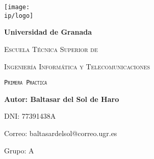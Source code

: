 \documentclass[..]{subfiles}
\title{}
\begin{document}
\begin{titlepage}
	\centering
	{\texttt{[image: \\ip/logo]}\par}
	\vspace{0cm}
	{\bfseries\LARGE Universidad de Granada \par}

	\vspace{1cm}
	{\scshape\Large Escuela Técnica Superior de \par}
	{\scshape\Large Ingeniería Informática y Telecomunicaciones \par}

	\vspace{5cm}
	{\scshape\Large \texttt{Primera Practica} \par}

	\vspace{7.5cm}
	{ \textbf{Autor: Baltasar del Sol de Haro} \par}
	{ DNI: 77391438A \par}
	{ Correo: baltasardelsol@correo.ugr.es \par}
	{ Grupo: A \par}

\end{titlepage}
\end{document}

